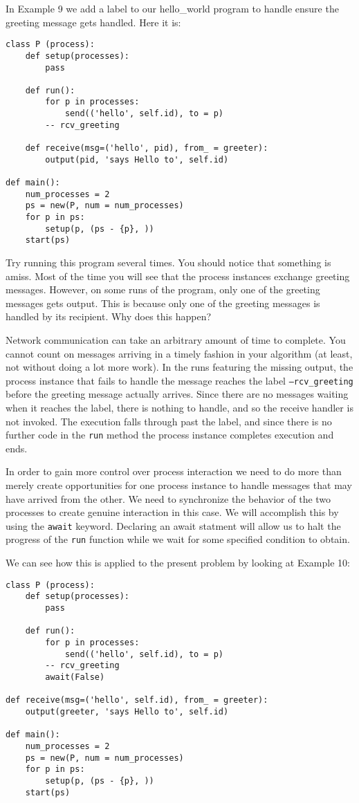\documentclass[11pt]{article}
\begin{document}
In Example 9 we add a label to our hello\_world program to handle ensure the
greeting message gets handled. Here it is:
\begin{lstlisting}[caption={hello\_world09.da - Yield Points}, label={lst:hw09}]
class P (process):
    def setup(processes):
        pass

    def run():
        for p in processes:
            send(('hello', self.id), to = p)
        -- rcv_greeting

    def receive(msg=('hello', pid), from_ = greeter):
        output(pid, 'says Hello to', self.id)
        
def main():
    num_processes = 2
    ps = new(P, num = num_processes)
    for p in ps:
        setup(p, (ps - {p}, ))
    start(ps)
\end{lstlisting}

Try running this program several times. You should notice that something is
amiss. Most of the time you will see that the process instances exchange
greeting messages. However, on some runs of the program, only one of the
greeting  messages gets output. This is because only one of the greeting
messages is handled by its recipient. Why does this happen?

Network communication can take an arbitrary amount of time to complete.  You
cannot count on messages arriving in a timely fashion in your algorithm (at
least, not without doing a lot more work). In the runs featuring the missing
output, the process instance that fails to handle the message reaches the label
\texttt{--rcv\_greeting} before the greeting message actually arrives. Since
there are no messages waiting when it reaches the label, there is nothing to
handle, and so the receive handler is not invoked. The execution falls through
past the label, and since there is no further code in the \texttt{run} method
the process instance completes execution and ends.

In order to gain more control over process interaction we need to do more than
merely create opportunities for one process instance to handle messages that
may have arrived from the other. We need to synchronize the behavior of the
two processes to create genuine interaction in this case. We will accomplish
this by using the \texttt{await} keyword. Declaring an await statment will
allow us to halt the progress of the \texttt{run} function while we wait for
some specified condition to obtain.

We can see how this is applied to the present problem by looking at Example 10:

\begin{lstlisting}[caption={hello\_world10.da - Synchronizing with Await Statements}, label={lst:hw10}]
class P (process):
    def setup(processes):
        pass

    def run():
        for p in processes:
            send(('hello', self.id), to = p)
        -- rcv_greeting
        await(False)

def receive(msg=('hello', self.id), from_ = greeter):
    output(greeter, 'says Hello to', self.id)

def main():
    num_processes = 2
    ps = new(P, num = num_processes)
    for p in ps:
        setup(p, (ps - {p}, ))
    start(ps)
\end{lstlisting}
\end{document}
